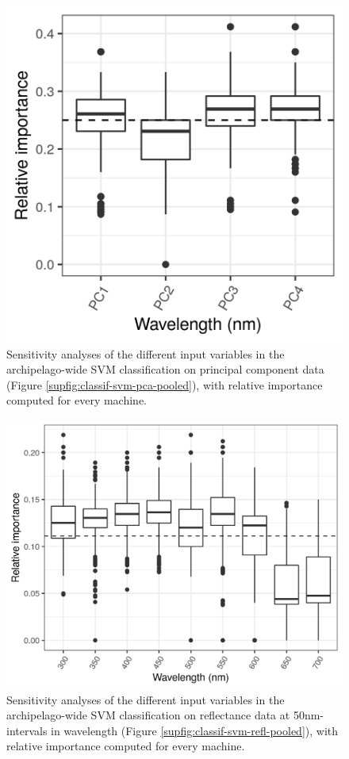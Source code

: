 \begin{figure}[H]
	\centering
	\includegraphics[width=\textwidth]{"../analyses/04-machine learning/plots/importance_svm_pca_pooled"}
	\caption{Sensitivity analyses of the different input variables in the archipelago-wide SVM classification on principal component data (Figure \ref{supfig:classif-svm-pca-pooled}), with relative importance computed for every machine.}
	\label{supfig:importance-svm-pca-pooled}
\end{figure}

\begin{figure}[H]
	\centering
	\includegraphics[width=\textwidth]{"../analyses/04-machine learning/plots/importance_svm_refl_pooled"}
	\caption{Sensitivity analyses of the different input variables in the archipelago-wide SVM classification on reflectance data at 50nm-intervals in wavelength (Figure \ref{supfig:classif-svm-refl-pooled}), with relative importance computed for every machine.}
	\label{supfig:importance-svm-refl-pooled}
\end{figure}

